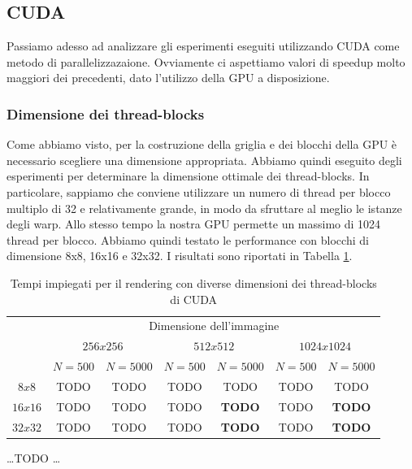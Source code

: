 \subsection{CUDA}\label{subsec:test_cuda}
Passiamo adesso ad analizzare gli esperimenti eseguiti utilizzando CUDA come metodo di parallelizzazaione.
Ovviamente ci aspettiamo valori di speedup molto maggiori dei precedenti, dato l'utilizzo della GPU a disposizione.

\subsubsection{Dimensione dei thread-blocks}
Come abbiamo visto, per la costruzione della griglia e dei blocchi della GPU è necessario scegliere una dimensione appropriata.
Abbiamo quindi eseguito degli esperimenti per determinare la dimensione ottimale dei thread-blocks.
In particolare, sappiamo che conviene utilizzare un numero di thread per blocco multiplo di 32 e relativamente grande, in modo da sfruttare al meglio le istanze degli warp.
Allo stesso tempo la nostra GPU permette un massimo di 1024 thread per blocco.
Abbiamo quindi testato le performance con blocchi di dimensione 8x8, 16x16 e 32x32.
I risultati sono riportati in Tabella \ref{tab:cuda_blocks}.
\begin{table}[H]
    \centering
    \begin{tabular}{c|c|c|c|c|c|c|}
        & \multicolumn{6}{|c|}{Dimensione dell'immagine} \\
        & \multicolumn{2}{|c|}{$256x256$} & \multicolumn{2}{|c|}{$512x512$} & \multicolumn{2}{|c|}{$1024x1024$} \\
        & $N=500$ & $N=5000$ & $N=500$ & $N=5000$ & $N=500$ & $N=5000$ \\
        \hline
        $8x8$ & TODO & TODO & TODO & TODO & TODO & TODO \\
        $16x16$ & TODO & TODO & TODO & \textbf{TODO} & TODO & \textbf{TODO} \\
        $32x32$ & TODO & TODO & TODO & \textbf{TODO} & TODO & \textbf{TODO} \\
    \end{tabular}
    \caption{\label{tab:cuda_blocks}Tempi impiegati per il rendering con diverse dimensioni dei thread-blocks di CUDA}
\end{table}

\dots TODO \dots

